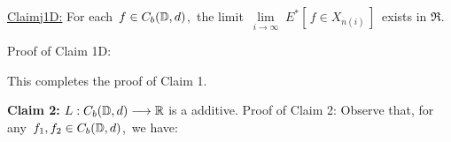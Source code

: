 \vskip 0.8cm
\begin{center}\begin{minipage}{6.5in}
\underline{Claim{{\color{white}j}}1D:}\;\;
For each \,$f \in C_{b}(\mathbb{D},d)$,\, the limit
\,$\underset{i\rightarrow\infty}{\lim}\; E^{*}\!\left[\,f \in X_{n(i)}\,\right]$\,
exists in $\Re$.
\end{minipage}\end{center}
Proof of Claim 1D:\;\;

\vskip 0.5cm
\noindent
This completes the proof of Claim 1.

\vskip 0.5cm
\noindent
\textbf{Claim 2:}\;\;
$L : C_{b}(\mathbb{D},d) \longrightarrow \mathbb{R}$ is a additive.
\vskip 0.2cm
\noindent
Proof of Claim 2:\;\;
Observe that, for any \,$f_{1}, f_{2} \in C_{b}(\mathbb{D},d)$,\, we have:
